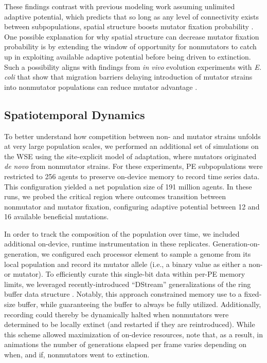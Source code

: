 These findings contrast with previous modeling work assuming unlimited adaptive potential, which predicts that so long as any level of connectivity exists between subpopulations, spatial structure boosts mutator fixation probability \citep{raynes2019migration}.
One possible explanation for why spatial structure can decrease mutator fixation probability is by extending the window of opportunity for nonmutators to catch up in exploiting available adaptive potential before being driven to extinction.
Such a possibility aligns with findings from \textit{in vivo} evolution experiments with \textit{E. coli} that show that migration barriers delaying introduction of mutator strains into nonmutator populations can reduce mutator advantage \citep{lechat2006escherichia}.

\subsection{Spatiotemporal Dynamics}
\label{sec:dynamics}

To better understand how competition between non- and mutator strains unfolds at very large population scales, we performed an additional set of simulations on the WSE using the site-explicit model of adaptation, where mutators originated \textit{de novo} from nonmutator strains.
For these experiments, PE subpopulations were restricted to 256 agents to preserve on-device memory to record time series data.
This configuration yielded a net population size of 191 million agents.
In these runs, we probed the critical region where outcomes transition between nonmutator and mutator fixation, configuring adaptive potential between 12 and 16 available beneficial mutations.

In order to track the composition of the population over time, we included additional on-device, runtime instrumentation in these replicates.
Generation-on-generation, we configured each processor element to sample a genome from its local population and record its mutator allele (i.e., a binary value as either a non- or mutator).
To efficiently curate this single-bit data within per-PE memory limits, we leveraged recently-introduced ``DStream'' generalizations of the ring buffer data structure \citep{moreno2024algorithms}.
Notably, this approach constrained memory use to a fixed-size buffer, while guaranteeing the buffer to always be fully utilized.
Additionally, recording could thereby be dynamically halted when nonmutators were determined to be locally extinct (and restarted if they are reintroduced).
While this scheme allowed maximization of on-device resources, note that, as a result, in animations the number of generations elapsed per frame varies depending on when, and if, nonmutators went to extinction.

